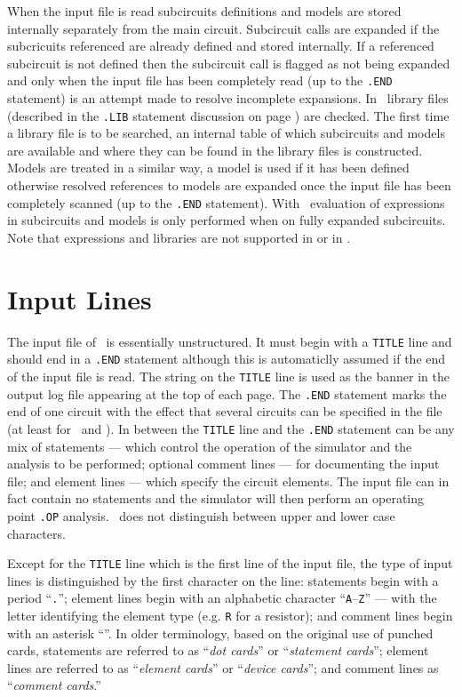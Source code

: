 When the input file is read subcircuits definitions and models
are stored internally separately from the main circuit. Subcircuit calls
are expanded if the subcricuits referenced are already defined and stored
internally.  If a referenced subcircuit is not defined then
the subcircuit call is flagged as not being expanded and only when the input
file has been completely read (up to the {\tt .END} statement)
is an attempt made to resolve incomplete
expansions.  In \pspice\ library files (described in the {\tt .LIB}
statement discussion on page \pageref{.LIBstatement}) are checked.
The first time a library file is to be searched, an internal table of
which subcircuits and models are available and where they can be found in
the library files is constructed.
Models are treated in a similar way, a model is used if it has been defined
otherwise resolved references to models are expanded once the input file
has been completely scanned (up to the {\tt .END} statement).
With \pspice\ evaluation of expressions in subcircuits and models is only
performed when on fully expanded subcircuits. Note that expressions and
libraries are not supported in \spicetwo or in \spicethree .

\section{Input Lines}
The input file of \spice\ is essentially unstructured.
It must begin with a {\tt TITLE} line
and should end in a
{\tt .END} statement although this is
automaticlly assumed if the end of the input file is read.
The string on the {\tt TITLE} line is
used as the banner in the output log file appearing at
the top of each page.  The {\tt .END} statement marks the end of
one circuit with the effect that several circuits can be specified in
the file (at least for
\spicethree\ and \pspice ).
In between the {\tt TITLE} line and the {\tt .END}
statement can be any mix of statements --- which control the operation of the
simulator and the analysis to be performed; optional comment lines --- for
documenting the input file; and element lines --- which specify
the circuit elements.
The input file can in fact contain no statements and the simulator will
then perform an operating point {\tt .OP} analysis.
\spice\ does not distinguish between upper and lower case characters.

Except for the {\tt TITLE} line which is the first line of the input file,
the type of input lines is distinguished by the first character on the line:
statements begin with a period ``{\tt .}''; element lines begin with
an alphabetic character ``{\tt A}--{\tt Z}'' --- with the letter identifying the
element type (e.g. {\tt R} for a resistor); and comment lines begin with
an asterisk ``{\tt *}''. In older terminology, based on the original use of
punched cards, statements are referred to as ``{\it dot cards}'' or
``{\it statement cards}''; element lines are referred to as ``{\it element
cards}'' or ``{\it device
cards}''; and comment lines as ``{\it comment cards}.''

